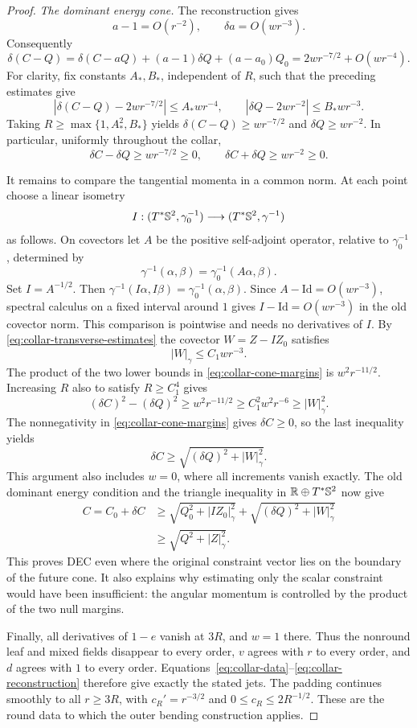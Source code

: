 \begin{proof}
\medskip
\noindent\emph{The dominant energy cone.}
The reconstruction gives
\[
 a-1=O(r^{-2}),\qquad \delta a=O(wr^{-3}).
\]
Consequently
\[
 \delta(C-Q)
 =\delta(C-aQ)+(a-1)\delta Q+(a-a_0)Q_0
 =2wr^{-7/2}+O(wr^{-4}).
\]
For clarity, fix constants $A_*,B_*$, independent of $R$, such that
the preceding estimates give
\[
 \left|\delta(C-Q)-2wr^{-7/2}\right|\leq A_*wr^{-4},
 \qquad
 \left|\delta Q-2wr^{-2}\right|\leq B_*wr^{-3}.
\]
Taking $R\geq\max\{1,A_*^2,B_*\}$ yields
$\delta(C-Q)\geq wr^{-7/2}$ and $\delta Q\geq wr^{-2}$.
In particular, uniformly throughout the collar,
\begin{equation}\label{eq:collar-cone-margins}
 \delta C-\delta Q\geq wr^{-7/2}\geq0,
 \qquad
 \delta C+\delta Q\geq wr^{-2}\geq0.
\end{equation}

It remains to compare the tangential momenta in a common norm.  At each
point choose a linear isometry
\[
 I:(T^*\mathbb S^2,\gamma_0^{-1})\longrightarrow
       (T^*\mathbb S^2,\gamma^{-1})
\]
as follows. On covectors let $A$ be the positive self-adjoint operator,
relative to $\gamma_0^{-1}$, determined by
\[
 \gamma^{-1}(\alpha,\beta)=\gamma_0^{-1}(A\alpha,\beta).
\]
Set $I=A^{-1/2}$. Then
$\gamma^{-1}(I\alpha,I\beta)=\gamma_0^{-1}(\alpha,\beta)$.
Since $A-\mathrm{Id}=O(wr^{-3})$, spectral calculus on a fixed interval
around $1$ gives $I-\mathrm{Id}=O(wr^{-3})$ in the old covector norm.
This comparison is pointwise and needs no derivatives of $I$. By
\eqref{eq:collar-transverse-estimates} the covector
$W=Z-IZ_0$ satisfies
\[
 |W|_\gamma\leq C_1wr^{-3}.
\]
The product of the two lower bounds in
\eqref{eq:collar-cone-margins} is $w^2r^{-11/2}$. Increasing $R$ also
to satisfy $R\geq C_1^4$ gives
\[
 (\delta C)^2-(\delta Q)^2
 \geq w^2r^{-11/2}\geq C_1^2w^2r^{-6}\geq|W|_\gamma^2.
\]
The nonnegativity in \eqref{eq:collar-cone-margins} gives $\delta C\geq0$,
so the last inequality yields
\[
 \delta C\geq\sqrt{(\delta Q)^2+|W|_\gamma^2}.
\]
This argument also includes $w=0$, where all increments vanish exactly.
The old dominant energy condition and the triangle inequality in
$\mathbb R\oplus T^*\mathbb S^2$ now give
\begin{align*}
 C=C_0+\delta C
 &\geq\sqrt{Q_0^2+|IZ_0|_\gamma^2}
       +\sqrt{(\delta Q)^2+|W|_\gamma^2}\\
 &\geq\sqrt{Q^2+|Z|_\gamma^2}.
\end{align*}
This proves DEC even where the original constraint vector lies on
the boundary of the future cone. It also explains why estimating only
the scalar constraint would have been insufficient: the angular
momentum is controlled by the product of the two null margins.

Finally, all derivatives of $1-e$ vanish at $3R$, and $w=1$ there.
Thus the nonround leaf and mixed fields disappear to every order,
$v$ agrees with $r$ to every order, and $d$ agrees with $1$ to every
order. Equations~\eqref{eq:collar-data}--\eqref{eq:collar-reconstruction}
therefore give exactly the stated jets. The padding continues smoothly
to all $r\geq3R$, with $c_R'=r^{-3/2}$ and
$0\leq c_R\leq2R^{-1/2}$. These are the round data to which the
outer bending construction applies.
\end{proof}
